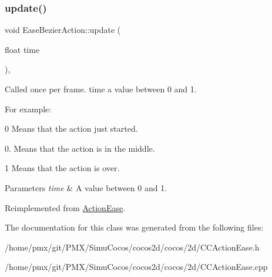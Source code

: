 \subsubsection{\texorpdfstring{update()}{update()}\hspace{0.1cm}{\footnotesize\ttfamily [2/2]}}
{\footnotesize\ttfamily void Ease\+Bezier\+Action\+::update (\begin{DoxyParamCaption}\item[{float}]{time }\end{DoxyParamCaption})\hspace{0.3cm}{\ttfamily [override]}, {\ttfamily [virtual]}}

Called once per frame. time a value between 0 and 1.

For example\+:
\begin{DoxyItemize}
\item 0 Means that the action just started.
\item 0. Means that the action is in the middle.
\item 1 Means that the action is over.
\end{DoxyItemize}


\begin{DoxyParams}{Parameters}
{\em time} & A value between 0 and 1. \\
\hline
\end{DoxyParams}


Reimplemented from \hyperlink{classActionEase_a77679f09c02cf75fb54776470c339fc5}{Action\+Ease}.



The documentation for this class was generated from the following files\+:\begin{DoxyCompactItemize}
\item 
/home/pmx/git/\+P\+M\+X/\+Simu\+Cocos/cocos2d/cocos/2d/C\+C\+Action\+Ease.\+h\item 
/home/pmx/git/\+P\+M\+X/\+Simu\+Cocos/cocos2d/cocos/2d/C\+C\+Action\+Ease.\+cpp\end{DoxyCompactItemize}

